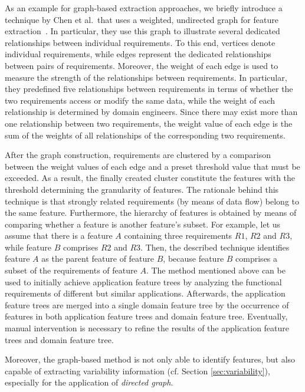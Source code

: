 \documentclass[graybox]{svmult}
\begin{document}
 As an example for graph-based extraction approaches, we briefly introduce a technique by Chen et al.\ that uses a weighted, undirected graph for feature extraction~\cite{ChenZZM05}. 
 In particular, they use this graph to illustrate several dedicated relationships between individual requirements. 
 To this end, vertices denote individual requirements, while edges represent the dedicated relationships between pairs of requirements. 
 Moreover, the weight of each edge is used to measure the strength of the relationships between requirements. 
 In particular, they predefined five relationships between requirements in terms of whether the two requirements access or modify the same data, while the weight of each relationship is determined by domain engineers. Since there may exist more than one relationship between two requirements, the weight value of each edge is the sum of the weights of all relationships of the corresponding two requirements.
 
After the graph construction, requirements are clustered by a comparison between the weight values of each edge and a preset threshold value that must be exceeded.
As a result, the finally created cluster constitute the features with the threshold determining the granularity of features.
The rationale behind this technique is that strongly related requirements (by means of data flow) belong to the same feature.
Furthermore, the hierarchy of features is obtained by means of comparing whether a feature is another feature's subset. For example, let us assume that there is a feature $A$ containing three requirements $R1$, $R2$ and $R3$, while feature $B$ comprises $R2$ and $R3$. Then, the described technique identifies feature $A$ as the parent feature of feature $B$, because feature $B$ comprises a subset of the requirements of feature $A$. 
The method mentioned above can be used to initially achieve application feature trees by analyzing the functional requirements of different but similar applications. Afterwards, the application feature trees are merged into a single domain feature tree by the occurrence of features in both application feature trees and domain feature tree. 
Eventually, manual intervention is necessary to refine the results of the application feature trees and domain feature tree.

Moreover, the graph-based method is not only able to identify features, but also capable of extracting variability information (cf. Section \ref{sec:variability}), especially for the application of \textit{directed graph}.
\end{document}
